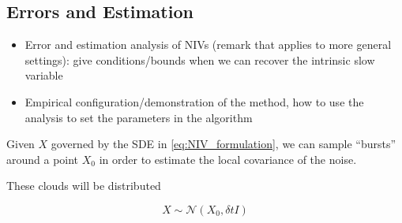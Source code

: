 \documentclass[1p]{elsarticle}
\begin{document}
\subsection{Errors and Estimation}

\begin{itemize}
\item Error and estimation analysis of NIVs (remark that applies to more general settings): give conditions/bounds when we can recover the intrinsic slow variable
%
\item Empirical configuration/demonstration of the method, how to use the analysis to set the parameters in the algorithm
\end{itemize}

Given $X$ governed by the SDE in \eqref{eq:NIV_formulation}, we can sample ``bursts'' around a point $X_0$ in order to estimate the local covariance of the noise. 

These clouds will be distributed 

\begin{equation}
X \sim \mathcal{N}\left( X_0, \delta t I \right)
\end{equation}
\end{document}
